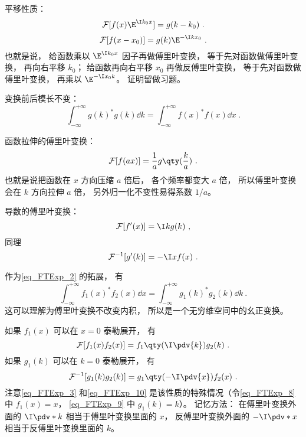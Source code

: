 平移性质：
\begin{equation}\label{eq_FTExp_4}
\mathcal F [f(x) \E^{\I k_0 x}] = g(k - k_0)~.
\end{equation}
\begin{equation}\label{eq_FTExp_7}
\mathcal F[f(x - x_0)] = g(k) \E^{-\I k x_0}~.
\end{equation}
也就是说， 给函数乘以 $\E^{\I k_0 x}$ 因子再做傅里叶变换， 等于先对函数做傅里叶变换， 再向右平移 $k_0$； 给函数再向右平移 $x_0$ 再做反傅里叶变换， 等于先对函数做傅里叶变换， 再乘以 $\E^{-\I x_0 k}$。 证明留做习题。

变换前后模长不变：
\begin{equation}\label{eq_FTExp_2}
\int_{-\infty}^{+\infty} g(k)^* g(k) \dd{k} = \int_{-\infty}^{+\infty} f(x)^* f(x) \dd{x}~.
\end{equation}

函数拉伸的傅里叶变换：
\begin{equation}
\mathcal F[f(ax)] = \frac{1}{a} g\qty(\frac{k}{a})~.
\end{equation}
也就是说把函数在 $x$ 方向压缩 $a$ 倍后， 各个频率都变大 $a$ 倍， 所以傅里叶变换会在 $k$ 方向拉伸 $a$ 倍， 另外归一化不变性易得系数 $1/a$。

导数的傅里叶变换：
\begin{equation}\label{eq_FTExp_3}
\mathcal F [f'(x)] = \I k g(k)~,
\end{equation}
同理
\begin{equation}\label{eq_FTExp_10}
\mathcal F^{-1} [g'(k)] = -\I x f(x)~.
\end{equation}

作为\autoref{eq_FTExp_2} 的拓展， 有
\begin{equation}
\int_{-\infty}^{+\infty} f_1(x)^* f_2(x) \dd{x} = \int_{-\infty}^{+\infty} g_1(k)^* g_2(k) \dd{k}~.
\end{equation}
这可以理解为傅里叶变换不改变内积， 所以是一个无穷维空间中的幺正变换。

如果 $f_1(x)$ 可以在 $x = 0$ 泰勒展开， 有
\begin{equation}\label{eq_FTExp_8}
\mathcal{F}[f_1(x) f_2(x)] = f_1\qty(\I \pdv{k}) g_2(k)~.
\end{equation}
如果 $g_1(k)$ 可以在 $k = 0$ 泰勒展开， 有
\begin{equation}\label{eq_FTExp_9}
\mathcal{F}^{-1}[g_1(k) g_2(k)] = g_1\qty(-\I \pdv{x}) f_2(x)~.
\end{equation}
注意\autoref{eq_FTExp_3} 和\autoref{eq_FTExp_10} 是该性质的特殊情况（令\autoref{eq_FTExp_8} 中 $f_1(x) = x$， \autoref{eq_FTExp_9} 中 $g_1(k) = k$）。 记忆方法： 在傅里叶变换外面的 $\I\pdv*{k}$ 相当于傅里叶变换里面的 $x$， 反傅里叶变换外面的 $-\I\pdv*{x}$ 相当于反傅里叶变换里面的 $k$。

